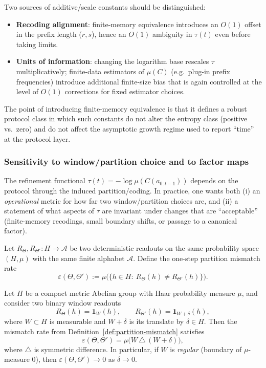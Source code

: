 \begin{remark}\label{rem:tau-constants}
Two sources of additive/scale constants should be distinguished:
\begin{itemize}[leftmargin=*,itemsep=2pt]
  \item \textbf{Recoding alignment}: finite-memory equivalence introduces an $O(1)$ offset in the prefix length ($r,s$), hence an $O(1)$ ambiguity in $\tau(t)$ even before taking limits.
  \item \textbf{Units of information}: changing the logarithm base rescales $\tau$ multiplicatively; finite-data estimators of $\mu(C)$ (e.g.\ plug-in prefix frequencies) introduce additional finite-size bias that is again controlled at the level of $O(1)$ corrections for fixed estimator choices.
\end{itemize}
The point of introducing finite-memory equivalence is that it defines a robust protocol class in which such constants do not alter the entropy class (positive vs.\ zero) and do not affect the asymptotic growth regime used to report ``time'' at the protocol layer.
\end{remark}

\subsubsection{Sensitivity to window/partition choice and to factor maps}\label{sec:info-time:sensitivity}

The refinement functional $\tau(t)=-\log\mu(C(a_{0:t-1}))$ depends on the protocol through the induced partition/coding. In practice, one wants both (i) an \emph{operational} metric for how far two window/partition choices are, and (ii) a statement of what aspects of $\tau$ are invariant under changes that are ``acceptable'' (finite-memory recodings, small boundary shifts, or passage to a canonical factor).

\begin{definition}\label{def:partition-mismatch}
Let $R_\Theta,R_{\Theta'}:H\to\mathcal{A}$ be two deterministic readouts on the same probability space $(H,\mu)$ with the same finite alphabet $\mathcal{A}$. Define the one-step partition mismatch rate
\[
\varepsilon(\Theta,\Theta'):=\mu\bigl(\{h\in H:\ R_\Theta(h)\neq R_{\Theta'}(h)\}\bigr).
\]
\end{definition}

\begin{proposition}\label{prop:window-mismatch-boundary}
Let $H$ be a compact metric Abelian group with Haar probability measure $\mu$, and consider two binary window readouts
\[
R_\Theta(h)=\mathbf{1}_{W}(h),\qquad R_{\Theta'}(h)=\mathbf{1}_{W+\delta}(h),
\]
where $W\subset H$ is measurable and $W+\delta$ is its translate by $\delta\in H$. Then the mismatch rate from Definition~\ref{def:partition-mismatch} satisfies
\[
\varepsilon(\Theta,\Theta')=\mu\bigl(W\,\triangle\,(W+\delta)\bigr),
\]
where $\triangle$ is symmetric difference. In particular, if $W$ is \emph{regular} (boundary of $\mu$-measure $0$), then $\varepsilon(\Theta,\Theta')\to 0$ as $\delta\to 0$.
\end{proposition}

